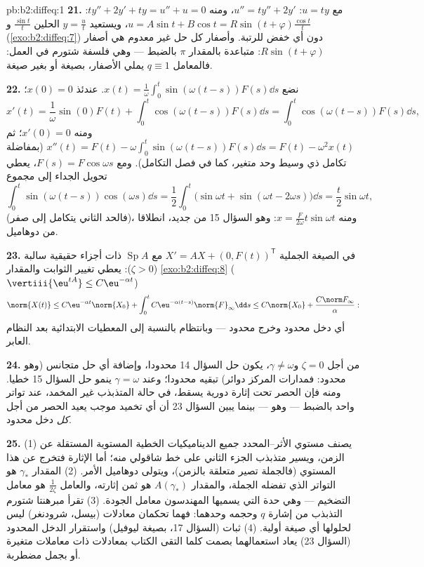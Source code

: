 \begin{solution}{pb:b2:diffeq:1}
\textbf{21.} مع $u = ty$: $u'' = ty'' + 2y'$، ومنه $ty'' + 2y'
+ ty = u'' + u = 0$: $u = A\sin t + B\cos t = R\sin(t +
\varphi)$، ويستعيد
$y = \frac{u}{t}$ الحلين $\frac{\sin t}t$ و$\frac{\cos t}t$ (\cref{exo:b2:diffeq:7}) دون أي خفض للرتبة. وأصفار كل
حل غير معدوم هي أصفار $R\sin(t + \varphi)$: متباعدة بالمقدار $\pi$ بالضبط ---
وهي فلسفة شتورم في العمل: فالمعامل $q \equiv 1$ يملي الأصفار، بصيغة أو
بغير صيغة.

\textbf{22.} نضع $x(t) =
\frac1\omega\int_0^t\sin(\omega(t-s))F(s)\dd s$. عندئذ $x(0) =
0$؛
\[
x'(t) = \frac1\omega\sin(0)F(t) +
\int_0^t\cos(\omega(t-s))F(s)\dd s
= \int_0^t\cos(\omega(t-s))F(s)\dd s ,
\]
ومنه $x'(0) = 0$؛ ثم $x''(t) = F(t) -
\omega\int_0^t\sin(\omega(t-s))F(s)\dd s = F(t) - \omega^2x(t)$ (بمفاضلة تكامل ذي وسيط وحد متغير، كما في
فصل التكامل). ومع $F(s) = F\cos\omega s$، يعطي تحويل الجداء إلى مجموع
\[
\int_0^t\sin(\omega(t-s))\cos(\omega s)\dd s
= \frac12\int_0^t\bigl(\sin\omega t + \sin(\omega t -
2\omega s)\bigr)\dd s
= \frac{t}{2}\sin\omega t ,
\]
(فالحد الثاني يتكامل إلى صفر)، ومنه $x =
\frac{F}{2\omega}t\sin\omega t$: وهو السؤال 15 من جديد،
انطلاقا من دوهاميل.

\textbf{23.} في الصيغة الجملية $X' = AX + (0, F(t))^{\mathsf T}$ مع $\operatorname{Sp}A$ ذات أجزاء حقيقية
سالبة ($\zeta >
0$): يعطي تغيير الثوابت والمقدار \cref{exo:b2:diffeq:8} ($\vertiii{\eu^{tA}} \leq C\eu^{-\alpha t}$)
\[
\norm{X(t)} \leq C\eu^{-\alpha t}\norm{X_0}
+ \int_0^t C\eu^{-\alpha(t-s)}\norm{F}_\infty\dd s
\leq C\norm{X_0} + \frac{C\norm F_\infty}{\alpha} :
\]
أي دخل محدود وخرج محدود --- وبانتظام بالنسبة إلى المعطيات الابتدائية
بعد النظام العابر.

\textbf{24.} من أجل $\zeta = 0$ و$\gamma \neq \omega$، يكون حل السؤال 14 محدودا،
وإضافة أي حل متجانس (وهو محدود: فمدارات المركز دوائر) تبقيه محدودا؛
وعند $\gamma = \omega$ ينمو حل السؤال 15 خطيا. ومنه فإن الحصر تحت إثارة دورية
يسقط، في حالة المتذبذب غير المخمد، عند تواتر واحد بالضبط --- وهو
 --- بينما يبين السؤال 23 أن أي تخميد موجب يعيد الحصر من أجل
\emph{كل} دخل محدود.

\textbf{25.} (1) يصنف مستوي الأثر--المحدد جميع الديناميكيات الخطية
المستوية المستقلة عن الزمن، ويسير متذبذب الجزء الثاني على خط شاقولي
منه؛ أما الإثارة فتخرج عن هذا المستوي (فالجملة تصير متعلقة بالزمن)،
ويتولى دوهاميل الأمر. (2) المقدار $\gamma_*$ هو التواتر الذي تفضله
الجملة، والمقدار $A(\gamma_*)$ هو ثمن إثارته، والعامل $\frac{1}{2\zeta}$ هو معامل
التضخيم --- وهي حدة  التي يسميها المهندسون معامل الجودة. (3)
تقرأ مبرهنتا شتورم التذبذب من إشارة $q$ وحجمه وحدهما: فهما تحكمان
معادلات (بيسل، شرودنغر) ليس لحلولها أي صيغة أولية. (4) ثبات
 (السؤال 17، بصيغة ليوفيل) واستقرار الدخل المحدود (السؤال
23) يعاد استعمالهما بصمت كلما التقى الكتاب بمعادلات ذات معاملات
متغيرة أو بجمل مضطربة.
\end{solution}
